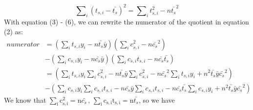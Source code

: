 \begin{appendices}
\begin{equation}\label{ap:eq7}
\sum\nolimits_i \left( t_{s,i}-\bar{t_{s}} \right)^{2} =\sum\nolimits_i t_{s,i}^{2} -n\bar{t_{s}}^{2}
\end{equation}
With equation (3) - (6), we can rewrite the numerator of the quotient in
equation (2) as:
\begin{equation}\label{ap:eq8}
\begin{aligned}
numerator&=\left( \sum\nolimits_i {t_{s,i}y_{i}} -n\bar{t_{s}}\bar{y} \right)\left( \sum\nolimits_i c_{s,i}^{2} -n\bar{c_{s}}^{2} \right)\\
&-\left( \sum\nolimits_i {c_{s,i}y_{i}} -n\bar{c_{s}}\bar{y} \right)\left( \sum\nolimits_i {c_{s,i}t_{s,i}} -n\bar{c_{s}}\bar{t_{s}} \right)\\
&=\left( \sum\nolimits_i {t_{s,i}y_{i}} \sum\nolimits_i c_{s,i}^{2} -n\bar{t_{s}}\bar{y}\sum\nolimits_i c_{s,i}^{2} -n\bar{c_{s}}^{2}\sum\nolimits_i {t_{s,i}y_{i}}
+n^{2}\bar{t_{s}}\bar{y}\bar{c_{s}}^{2} \right)\\
&-\left( \sum\nolimits_i {c_{s,i}y_{i}} \sum\nolimits_i {c_{s,i}t_{s,i}} -n\bar{c_{s}}\bar{y}\sum\nolimits_i {c_{s,i}t_{s,i}} -n\bar{c_{s}}\bar{t_{s}}\sum\nolimits_i {c_{s,i}y_{i}} +n^{2}\bar{t_{s}}\bar{y}\bar{c_{s}}^{2} \right)
\end{aligned}
\end{equation}
We know that $\sum\nolimits_\mathrm{i}\mathrm{c}_{\mathrm{s,i}}^{\mathrm{2}} \mathrm{=n}\bar{c_{s}}\mathrm{\, ,\,}\sum\nolimits_\mathrm{i}{\mathrm{c}_{\mathrm{s,i}}\mathrm{t}_{\mathrm{s,i}}}\mathrm{=n}\bar{t_{s}}$, so we have


\end{appendices}
